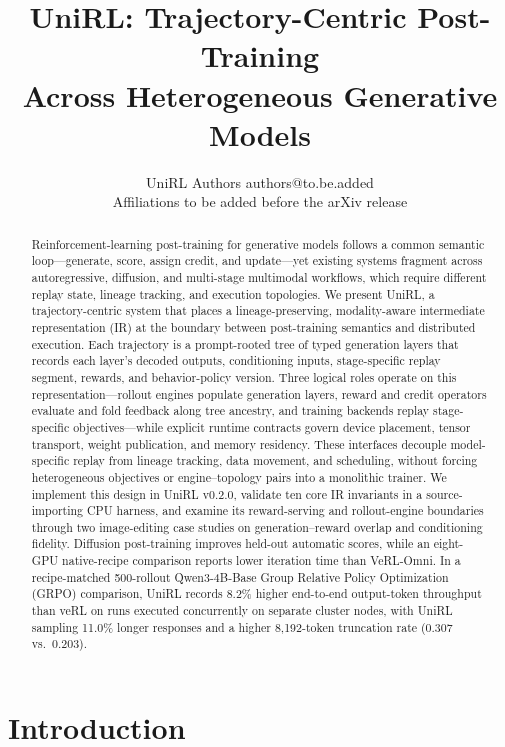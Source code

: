 \documentclass[10pt]{article}
\title{UniRL: Trajectory-Centric Post-Training\\
Across Heterogeneous Generative Models}
\author{\name UniRL Authors \email authors@to.be.added \\
      \addr Affiliations to be added before the arXiv release}
\begin{document}
\raggedbottom

\maketitle

\begin{abstract}
Reinforcement-learning post-training for generative models follows a common semantic loop---generate, score, assign credit, and update---yet existing systems fragment across autoregressive, diffusion, and multi-stage multimodal workflows, which require different replay state, lineage tracking, and execution topologies.
We present UniRL, a trajectory-centric system that places a lineage-preserving, modality-aware intermediate representation (IR) at the boundary between post-training semantics and distributed execution.
Each trajectory is a prompt-rooted tree of typed generation layers that records each layer's decoded outputs, conditioning inputs, stage-specific replay segment, rewards, and behavior-policy version.
Three logical roles operate on this representation---rollout engines populate generation layers, reward and credit operators evaluate and fold feedback along tree ancestry, and training backends replay stage-specific objectives---while explicit runtime contracts govern device placement, tensor transport, weight publication, and memory residency.
These interfaces decouple model-specific replay from lineage tracking, data movement, and scheduling, without forcing heterogeneous objectives or engine--topology pairs into a monolithic trainer.
We implement this design in UniRL v0.2.0, validate ten core IR invariants in a source-importing CPU harness, and examine its reward-serving and rollout-engine boundaries through two image-editing case studies on generation--reward overlap and conditioning fidelity.
Diffusion post-training improves held-out automatic scores, while an eight-GPU native-recipe comparison reports lower iteration time than VeRL-Omni.
In a recipe-matched 500-rollout Qwen3-4B-Base Group Relative Policy Optimization (GRPO) comparison, UniRL records 8.2\% higher end-to-end output-token throughput than veRL on runs executed concurrently on separate cluster nodes, with UniRL sampling 11.0\% longer responses and a higher 8,192-token truncation rate (0.307 vs.\ 0.203).
\end{abstract}

\section{Introduction}
\label{sec:introduction}
\end{document}
